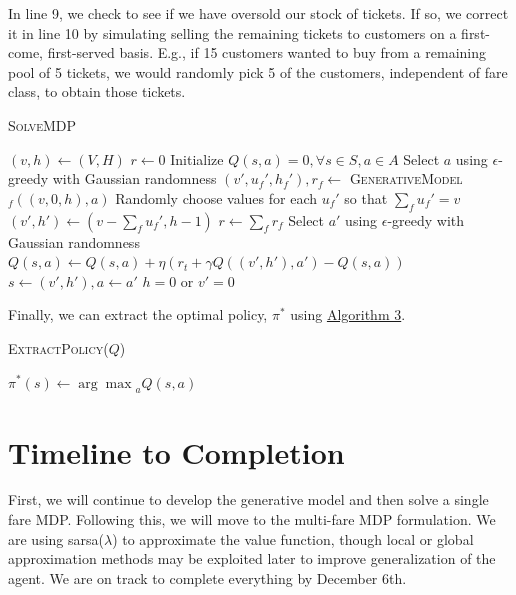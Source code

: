\documentclass[10pt,letterpaper]{article}
\begin{document}
\begin{multicols*}{2}
In line 9, we check to see if we have oversold our stock of tickets. If so, we correct it in line 10 by simulating selling the remaining tickets to customers on a first-come, first-served basis. E.g., if 15 customers wanted to buy from a remaining pool of 5 tickets, we would randomly pick 5 of the customers, independent of fare class, to obtain those tickets.

\begin{algorithm}[H]
\label{alg:solve-mdp}
	\caption{\textsc{SolveMDP}}
	\small\begin{algorithmic}[1]
        \State ${(v,h)} \leftarrow (V,H)$
    	\State ${r} \leftarrow 0$
    	\State Initialize $Q(s,a) = 0, \forall s \in S, a \in A$
    	\State Select $a$ using $\epsilon$-greedy with Gaussian randomness
    	\Repeat {}
                \State $(v',u_f',h_f'),r_f \leftarrow$ 
                \textsc{GenerativeModel$_f ((v, 0, h), a)$}
            \EndFor
     	        \State Randomly choose values for each $u_f'$ so that $\sum_f u_f' = v$
             \EndIf
             \State $(v', h') \leftarrow (v - \sum_f u_f', h - 1)$
    		\State $r \leftarrow \sum_f r_f$
    		\State Select $a'$ using $\epsilon$-greedy with Gaussian randomness
    		\State $Q(s,a) \leftarrow Q(s,a) + \eta(r_t + \gamma Q((v',h'),a') - Q(s,a))$
    		\State $s \leftarrow (v',h'), a \leftarrow a'$
     	\Until $h = 0$ or $v' = 0$
	\end{algorithmic}
\end{algorithm}

Finally, we can extract the optimal policy, $\pi^*$ using \hyperref[alg:extract-policy]{Algorithm 3}.

\begin{algorithm}[H]
\label{alg:extract-policy}
	\caption{\textsc{ExtractPolicy($Q$)}}
    	\small\begin{algorithmic}[1]
     	    \State $\pi^*(s) \leftarrow {\arg\max}_a Q(s,a)$
     	\EndFor
        \State\Return {$\pi^*$}
	\end{algorithmic}
\end{algorithm}

\section*{Timeline to Completion}

First, we will continue to develop the generative model and then solve a single fare MDP. Following this, we will move to the multi-fare MDP formulation. We are using sarsa($\lambda$) to approximate the value function, though local or global approximation methods may be exploited later to improve generalization of the agent. We are on track to complete everything by December 6th.


\end{multicols*}
\end{document}
